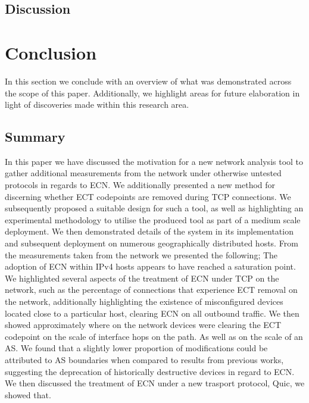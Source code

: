\documentclass{l4proj}
\begin{document}
\section{Discussion}

\chapter{Conclusion}

In this section we conclude with an overview of what was demonstrated across the scope of this paper. Additionally, we highlight areas for future elaboration in light of discoveries made within this research area.

\section{Summary}


In this paper we have discussed the motivation for a new network analysis tool to gather additional measurements from the network under otherwise untested protocols in regards to ECN. We additionally presented a new method for discerning whether ECT codepoints are removed during TCP connections. We subsequently proposed a suitable design for such a tool, as well as highlighting an experimental methodology to utilise the produced tool as part of a medium scale deployment. We then demonstrated details of the system in its implementation and subsequent deployment on numerous geographically distributed hosts. From the measurements taken from the network we presented the following; The adoption of ECN within IPv4 hosts appears to have reached a saturation point. We highlighted several aspects of the treatment of ECN under TCP on the network, such as the percentage of connections that experience ECT removal on the network, additionally highlighting the existence of misconfigured devices located close to a particular host, clearing ECN on all outbound traffic. We then showed approximately where on the network devices were clearing the ECT codepoint on the scale of interface hops on the path. As well as on the scale of an AS. We found that a slightly lower proportion of modifications could be attributed to AS boundaries when compared to results from previous works, suggesting the deprecation of historically destructive devices in regard to ECN. We then discussed the treatment of ECN under a new trasport protocol, Quic, we showed that.
\end{document}
